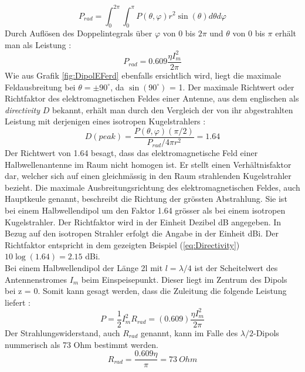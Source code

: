 \begin{equation}
P_{rad}=\int_0^{2\pi} \int_0^\pi P(\theta,\varphi)r^2\sin(\theta) d\theta d\varphi
\end{equation}
Durch Auflösen des Doppelintegrals über $\varphi$ von 0 bis $2\pi$ und $\theta$ von 0 bis $\pi$ erhält man als Leistung \cite{elliott1981antenna}:
\begin{equation}
P_{rad}=0.609 \frac{\eta I_{m}^{2}}{2\pi}
\end{equation}
Wie aus Grafik \ref{fig:DipolEFerd} ebenfalls ersichtlich wird, liegt die maximale Feldausbreitung bei $\theta =\pm 90 ^\circ $, da $\sin(90^\circ)  $ = 1.
Der maximale Richtwert oder Richtfaktor des elektromagnetischen Feldes einer Antenne, aus dem englischen als \textit{directivity} $D$ bekannt, erhält man durch den Vergleich der von ihr abgestrahlten Leistung mit derjenigen eines isotropen Kugelstrahlers \cite{elliott1981antenna}:
\begin{equation}
D(peak)=\frac{P(\theta,\varphi)(\pi/2)}{P_{rad}/ 4 \pi r^{2}} =1.64
\label{eq:Directivity}
\end{equation}
Der Richtwert von 1.64 besagt, dass das elektromagnetische Feld einer Halbwellenantenne im Raum nicht homogen ist. Er stellt einen Verhältnisfaktor dar, welcher sich auf einen gleichmässig in den Raum strahlenden Kugelstrahler bezieht. Die maximale Ausbreitungsrichtung des elektromagnetischen Feldes, auch Hauptkeule genannt, beschreibt die Richtung der grössten Abstrahlung. Sie ist bei einem Halbwellendipol um den Faktor 1.64 grösser als bei einem isotropen Kugelstrahler. Der Richtfaktor wird in der Einheit Dezibel dB angegeben. In Bezug auf den isotropen Strahler erfolgt die Angabe in der Einheit dBi. Der Richtfaktor entspricht in dem gezeigten Beispiel (\ref{eq:Directivity}) $10\log{(1.64)}=2.15$ dBi.\\

Bei einem Halbwellendipol der Länge 2l mit $l=\lambda/4 $ ist der Scheitelwert des Antennenstromes $I_{m}$ beim Einspeisepunkt. Dieser liegt im Zentrum des Dipols bei z = 0. Somit kann gesagt werden, dass die Zuleitung die folgende Leistung liefert \cite{Emant}:
\begin{equation}
P=\frac{1}{2} I_{m}^{2}R_{rad}=(0.609)\frac{\eta I_{m}^{2}}{2\pi}
\end{equation}
Der Strahlungswiderstand, auch $R_{rad}$ genannt, kann im Falle des $\lambda /2$-Dipols nummerisch als 73 Ohm bestimmt werden.
\begin{equation}\label{RradDipol}
R_{rad}=\frac{0.609 \eta}{\pi}= 73 \ Ohm
\end{equation}
